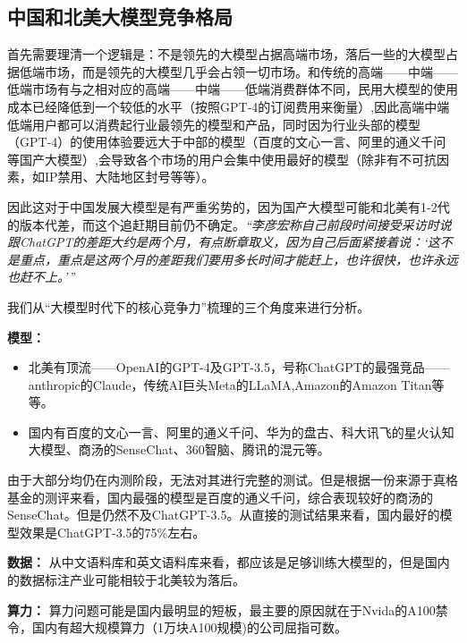 \subsection{中国和北美大模型竞争格局}
首先需要理清一个逻辑是：不是领先的大模型占据高端市场，落后一些的大模型占据低端市场，而是领先的大模型几乎会占领一切市场。和传统的高端——中端——低端市场有与之相对应的高端——中端——低端消费群体不同，民用大模型的使用成本已经降低到一个较低的水平（按照GPT-4的订阅费用来衡量）,因此高端中端低端用户都可以消费起行业最领先的模型和产品，同时因为行业头部的模型（GPT-4）的使用体验要远大于中部的模型（百度的文心一言、阿里的通义千问等国产大模型）,会导致各个市场的用户会集中使用最好的模型（除非有不可抗因素，如IP禁用、大陆地区封号等等）。

因此这对于中国发展大模型是有严重劣势的，因为国产大模型可能和北美有1-2代的版本代差，而这个追赶期目前仍不确定。\textit{“李彦宏称自己前段时间接受采访时说跟ChatGPT的差距大约是两个月，有点断章取义，因为自己后面紧接着说：‘这不是重点，重点是这两个月的差距我们要用多长时间才能赶上，也许很快，也许永远也赶不上。’”}

我们从“大模型时代下的核心竞争力”梳理的三个角度来进行分析。

\noindent\textbf{模型：}
\begin{itemize}
    \item 北美有顶流——OpenAI的GPT-4及GPT-3.5，号称ChatGPT的最强竞品——anthropic的Claude，传统AI巨头Meta的LLaMA,Amazon的Amazon Titan等等。
    \item 国内有百度的文心一言、阿里的通义千问、华为的盘古、科大讯飞的星火认知大模型、商汤的SenseChat、360智脑、腾讯的混元等。
\end{itemize}
由于大部分均仍在内测阶段，无法对其进行完整的测试。但是根据一份来源于真格基金的测评来看，国内最强的模型是百度的通义千问，综合表现较好的商汤的SenseChat。但是仍然不及ChatGPT-3.5。从直接的测试结果来看，国内最好的模型效果是ChatGPT-3.5的75\%左右。


\noindent\textbf{数据：}
从中文语料库和英文语料库来看，都应该是足够训练大模型的，但是国内的数据标注产业可能相较于北美较为落后。

\noindent\textbf{算力：}
算力问题可能是国内最明显的短板，最主要的原因就在于Nvida的A100禁令，国内有超大规模算力（1万块A100规模)的公司屈指可数。

